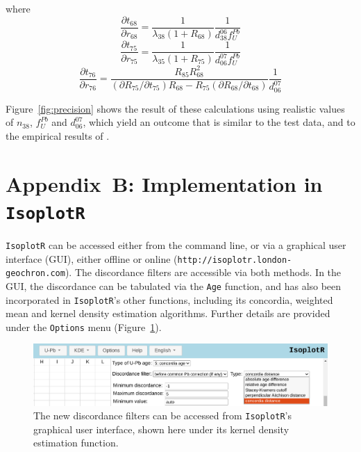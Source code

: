 \documentclass{article}
\begin{document}
where
\begin{equation}
    \frac{\partial{t_{68}}}{\partial{r_{68}}} = 
    \frac{1}{\lambda_{38}(1+R_{68})} \frac{1}{d^{06}_{38}f^{Pb}_{U}}
\end{equation}
\begin{equation}  
    \frac{\partial{t_{75}}}{\partial{r_{75}}} = 
    \frac{1}{\lambda_{35}(1+R_{75})} \frac{1}{d^{07}_{06}f^{Pb}_{U}}
\end{equation}
\begin{equation}  
  \frac{\partial{t_{76}}}{\partial{r_{76}}} =
  \frac{R_{85}R_{68}^2}
       {(\partial{R_{75}}/\partial{t_{75}})R_{68} -
         R_{75}(\partial{R_{68}}/\partial{t_{68}})}
       \frac{1}{d^{07}_{06}}
\end{equation}

Figure~\ref{fig:precision} shows the result of these calculations
using realistic values of $n_{38}$, $f^{Pb}_{U}$ and $d^{07}_{06}$,
which yield an outcome that is similar to the test data, and to the
empirical results of \citet{zimmermann2018}.

\section*{Appendix~B: Implementation in \texttt{IsoplotR}}
\label{app:IsoplotR}

\texttt{IsoplotR} can be accessed either from the command line, or via
a graphical user interface (GUI), either offline or online
(\texttt{http://isoplotr.london-geochron.com}).  The discordance
filters are accessible via both methods. In the GUI, the discordance
can be tabulated via the \texttt{Age} function, and has also been
incorporated in \texttt{IsoplotR}'s other functions, including its
concordia, weighted mean and kernel density estimation algorithms.
Further details are provided under the \texttt{Options} menu
(Figure~\ref{fig:IsoplotR}).

\begin{figure}
  \includegraphics[width=12cm]{IsoplotR.png}
  \caption{The new discordance filters can be accessed from
    \texttt{IsoplotR}'s graphical user interface, shown here under its
    kernel density estimation function.}
  \label{fig:IsoplotR}
\end{figure}
\end{document}
